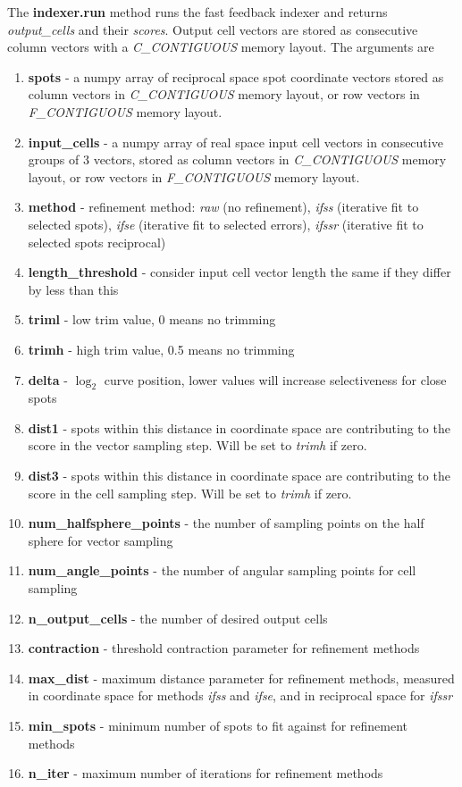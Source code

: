 \documentclass[a4paper,10pt]{article}
\begin{document}
The \textbf{indexer.run} method runs the fast feedback indexer and returns \emph{output\_cells} and their \emph{scores}. Output cell vectors are stored as consecutive column vectors with a \emph{C\_CONTIGUOUS} memory layout. The arguments are
%
\begin{enumerate}
 \item \textbf{spots} - a numpy array of reciprocal space spot coordinate vectors stored as column vectors in \emph{C\_CONTIGUOUS} memory layout, or row vectors in \emph{F\_CONTIGUOUS} memory layout.
 \item \textbf{input\_cells} - a numpy array of real space input cell vectors in consecutive groups of 3 vectors, stored as column vectors in \emph{C\_CONTIGUOUS} memory layout, or row vectors in \emph{F\_CONTIGUOUS} memory layout.
 \item \textbf{method} - refinement method: \emph{raw} (no refinement), \emph{ifss} (iterative fit to selected spots), \emph{ifse} (iterative fit to selected errors), \emph{ifssr} (iterative fit to selected spots reciprocal)
 \item \textbf{length\_threshold} - consider input cell vector length the same if they differ by less than this
 \item \textbf{triml} - low trim value, 0 means no trimming
 \item \textbf{trimh} - high trim value, 0.5 means no trimming
 \item \textbf{delta} - $\log_2$ curve position, lower values will increase selectiveness for close spots
 \item \textbf{dist1} - spots within this distance in coordinate space are contributing to the score in the vector sampling step. Will be set to \emph{trimh} if zero.
 \item \textbf{dist3} - spots within this distance in coordinate space are contributing to the score in the cell sampling step. Will be set to \emph{trimh} if zero.
 \item \textbf{num\_halfsphere\_points} - the number of sampling points on the half sphere for vector sampling
 \item \textbf{num\_angle\_points} - the number of angular sampling points for cell sampling
 \item \textbf{n\_output\_cells} - the number of desired output cells
 \item \textbf{contraction} - threshold contraction parameter for refinement methods
 \item \textbf{max\_dist} - maximum distance parameter for refinement methods, measured in coordinate space for methods \emph{ifss} and \emph{ifse}, and in reciprocal space for \emph{ifssr}
 \item \textbf{min\_spots} - minimum number of spots to fit against for refinement methods
 \item \textbf{n\_iter} - maximum number of iterations for refinement methods
\end{enumerate}
\end{document}
